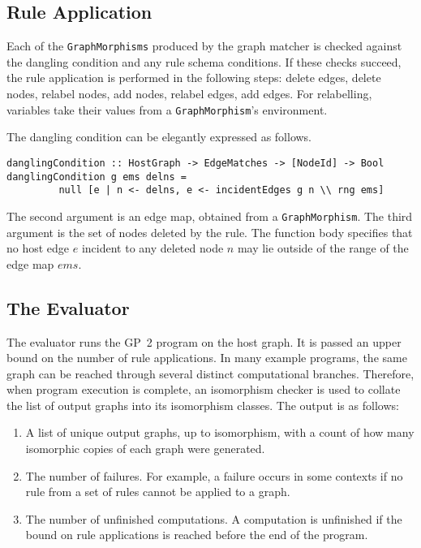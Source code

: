 \subsection{Rule Application}
Each of the \texttt{GraphMorphisms} produced by the graph matcher is checked against the dangling condition and any rule schema conditions. If these checks succeed, the rule application is performed in the following steps: delete edges, delete nodes, relabel nodes, add nodes, relabel edges, add edges. For relabelling, variables take their values from a \texttt{GraphMorphism}'s environment. 

The dangling condition can be elegantly expressed as follows.
\begin{verbatim}
danglingCondition :: HostGraph -> EdgeMatches -> [NodeId] -> Bool
danglingCondition g ems delns = 
         null [e | n <- delns, e <- incidentEdges g n \\ rng ems]
\end{verbatim}

The second argument is an edge map, obtained from a \texttt{GraphMorphism}. The third argument is the set of nodes deleted by the rule. The function body specifies that no host edge $e$ incident to any deleted node $n$ may lie outside of the range of the edge map $ems$.

\subsection{The Evaluator}\label{sec:eval}
The evaluator runs the GP~2 program on the host graph. It is passed an upper bound on the number of rule applications. In many example programs, the same graph can be reached through several distinct computational branches. Therefore, when program execution is complete, an isomorphism checker is used to collate the list of output graphs into its isomorphism classes. The output is as follows:

\begin{enumerate}
\item A list of unique output graphs, up to isomorphism, with a count of how many isomorphic copies of each graph were generated.
\item The number of failures. For example, a failure occurs in some contexts if no rule from a set of rules cannot be applied to a graph.
\item The number of unfinished computations. A computation is unfinished if the bound on rule applications is reached before the end of the program.
\end{enumerate}


